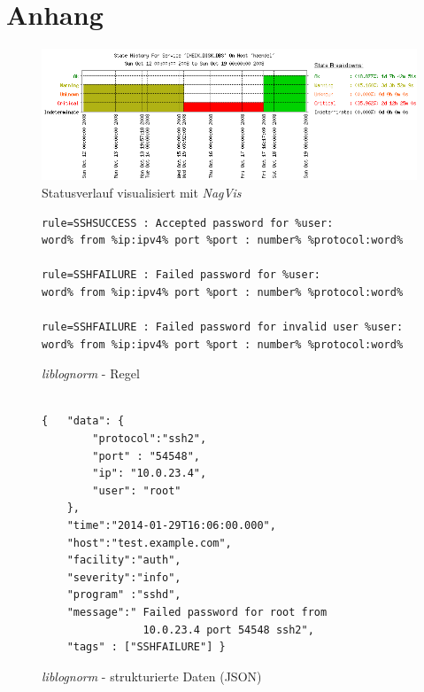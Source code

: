 \chapter*{Anhang}\label{appendix}
\thispagestyle{fancy}
\vspace{1cm}
\begin{figure}[htbp]
    \caption{Statusverlauf visualisiert mit \textit{NagVis}}
    \label{app:nag}\vspace{0.2cm}
    \centering
    \includegraphics[scale=0.5]{img/nag_trend}  
\end{figure}

\vspace{4cm}
\begin{figure}[h]
    \caption{\textit{liblognorm} - Regel}
    \label{app:liblognorm-rule}\vspace{0.2cm}
    \centering
\begin{minipage}{0.8\textwidth}
\begin{verbatim}
rule=SSHSUCCESS : Accepted password for %user:
word% from %ip:ipv4% port %port : number% %protocol:word%

rule=SSHFAILURE : Failed password for %user:
word% from %ip:ipv4% port %port : number% %protocol:word%

rule=SSHFAILURE : Failed password for invalid user %user:
word% from %ip:ipv4% port %port : number% %protocol:word%

\end{verbatim}
\end{minipage}
\end{figure}


\begin{figure}[h]
    \caption{\textit{liblognorm} - strukturierte Daten (JSON)}
    \label{app:liblognorm-normalisation}\vspace{0.2cm}
    \centering
    \begin{minipage}{0.8\textwidth}
\begin{verbatim}
        
{   "data": {
        "protocol":"ssh2",
        "port" : "54548",
        "ip": "10.0.23.4",
        "user": "root"
    },
    "time":"2014-01-29T16:06:00.000",
    "host":"test.example.com",
    "facility":"auth",
    "severity":"info",
    "program" :"sshd",
    "message":" Failed password for root from
                10.0.23.4 port 54548 ssh2",
    "tags" : ["SSHFAILURE"] }
\end{verbatim}
\end{minipage}
\end{figure}


